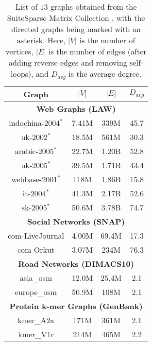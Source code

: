 \begin{table}[hbtp]
  \centering
  \caption{List of $13$ graphs obtained from the SuiteSparse Matrix Collection \cite{suite19}, with the directed graphs being marked with an asterisk. Here, $|V|$ is the number of vertices, $|E|$ is the number of edges (after adding reverse edges and removing self-loops), and $D_{avg}$ is the average degree.}
  \label{tab:dataset}
  \begin{tabular}{|c||c|c|c|}
    \toprule
    \textbf{Graph} &
    \textbf{\textbf{$|V|$}} &
    \textbf{\textbf{$|E|$}} &
    \textbf{\textbf{$D_{avg}$}} \\
    \midrule
    \multicolumn{4}{|c|}{\textbf{Web Graphs (LAW)}} \\ \hline
    indochina-2004$^*$ & 7.41M & 339M & 45.7 \\ \hline
    uk-2002$^*$ & 18.5M & 561M & 30.3 \\ \hline
    arabic-2005$^*$ & 22.7M & 1.20B & 52.8 \\ \hline
    uk-2005$^*$ & 39.5M & 1.71B & 43.4 \\ \hline
    webbase-2001$^*$ & 118M & 1.86B & 15.8 \\ \hline
    it-2004$^*$ & 41.3M & 2.17B & 52.6 \\ \hline
    sk-2005$^*$ & 50.6M & 3.78B & 74.7 \\ \hline
    \multicolumn{4}{|c|}{\textbf{Social Networks (SNAP)}} \\ \hline
    com-LiveJournal & 4.00M & 69.4M & 17.3 \\ \hline
    com-Orkut & 3.07M & 234M & 76.3 \\ \hline
    \multicolumn{4}{|c|}{\textbf{Road Networks (DIMACS10)}} \\ \hline
    asia\_osm & 12.0M & 25.4M & 2.1 \\ \hline
    europe\_osm & 50.9M & 108M & 2.1 \\ \hline
    \multicolumn{4}{|c|}{\textbf{Protein k-mer Graphs (GenBank)}} \\ \hline
    kmer\_A2a & 171M & 361M & 2.1 \\ \hline
    kmer\_V1r & 214M & 465M & 2.2 \\ \hline
  \bottomrule
  \end{tabular}
\end{table}
